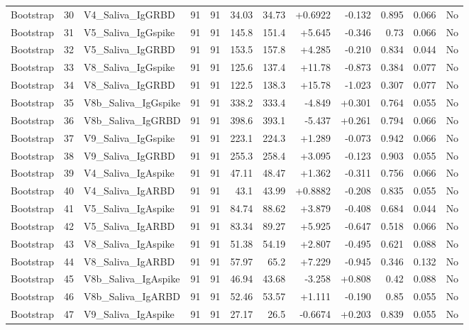 \begin{landscape}
\begin{longtable}{@{}lrp{4.0cm}rrrrrrrrr@{}}
Bootstrap & 30 & V4\_Saliva\_IgGRBD & 91 & 91 & 34.03 & 34.73 & +0.6922 & -0.132 & 0.895 & 0.066 & No \\
Bootstrap & 31 & V5\_Saliva\_IgGspike & 91 & 91 & 145.8 & 151.4 & +5.645 & -0.346 & 0.73 & 0.066 & No \\
Bootstrap & 32 & V5\_Saliva\_IgGRBD & 91 & 91 & 153.5 & 157.8 & +4.285 & -0.210 & 0.834 & 0.044 & No \\
Bootstrap & 33 & V8\_Saliva\_IgGspike & 91 & 91 & 125.6 & 137.4 & +11.78 & -0.873 & 0.384 & 0.077 & No \\
Bootstrap & 34 & V8\_Saliva\_IgGRBD & 91 & 91 & 122.5 & 138.3 & +15.78 & -1.023 & 0.307 & 0.077 & No \\
Bootstrap & 35 & V8b\_Saliva\_IgGspike & 91 & 91 & 338.2 & 333.4 & -4.849 & +0.301 & 0.764 & 0.055 & No \\
Bootstrap & 36 & V8b\_Saliva\_IgGRBD & 91 & 91 & 398.6 & 393.1 & -5.437 & +0.261 & 0.794 & 0.066 & No \\
Bootstrap & 37 & V9\_Saliva\_IgGspike & 91 & 91 & 223.1 & 224.3 & +1.289 & -0.073 & 0.942 & 0.066 & No \\
Bootstrap & 38 & V9\_Saliva\_IgGRBD & 91 & 91 & 255.3 & 258.4 & +3.095 & -0.123 & 0.903 & 0.055 & No \\
Bootstrap & 39 & V4\_Saliva\_IgAspike & 91 & 91 & 47.11 & 48.47 & +1.362 & -0.311 & 0.756 & 0.066 & No \\
Bootstrap & 40 & V4\_Saliva\_IgARBD & 91 & 91 & 43.1 & 43.99 & +0.8882 & -0.208 & 0.835 & 0.055 & No \\
Bootstrap & 41 & V5\_Saliva\_IgAspike & 91 & 91 & 84.74 & 88.62 & +3.879 & -0.408 & 0.684 & 0.044 & No \\
Bootstrap & 42 & V5\_Saliva\_IgARBD & 91 & 91 & 83.34 & 89.27 & +5.925 & -0.647 & 0.518 & 0.066 & No \\
Bootstrap & 43 & V8\_Saliva\_IgAspike & 91 & 91 & 51.38 & 54.19 & +2.807 & -0.495 & 0.621 & 0.088 & No \\
Bootstrap & 44 & V8\_Saliva\_IgARBD & 91 & 91 & 57.97 & 65.2 & +7.229 & -0.945 & 0.346 & 0.132 & No \\
Bootstrap & 45 & V8b\_Saliva\_IgAspike & 91 & 91 & 46.94 & 43.68 & -3.258 & +0.808 & 0.42 & 0.088 & No \\
Bootstrap & 46 & V8b\_Saliva\_IgARBD & 91 & 91 & 52.46 & 53.57 & +1.111 & -0.190 & 0.85 & 0.055 & No \\
Bootstrap & 47 & V9\_Saliva\_IgAspike & 91 & 91 & 27.17 & 26.5 & -0.6674 & +0.203 & 0.839 & 0.055 & No \\

\end{longtable}
\end{landscape}
